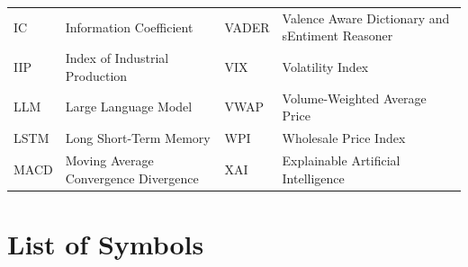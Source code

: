 \begin{center}
\begin{tabular}{@{}p{2.1cm}p{4.6cm}p{2.1cm}p{4.6cm}@{}}
IC & Information Coefficient & VADER & Valence Aware Dictionary and sEntiment Reasoner \\
IIP & Index of Industrial Production & VIX & Volatility Index \\
LLM & Large Language Model & VWAP & Volume-Weighted Average Price \\
LSTM & Long Short-Term Memory & WPI & Wholesale Price Index \\
MACD & Moving Average Convergence Divergence & XAI & Explainable Artificial Intelligence \\
\end{tabular}
\end{center}

\clearpage
\chapter*{List of Symbols}
\thispagestyle{plain}

